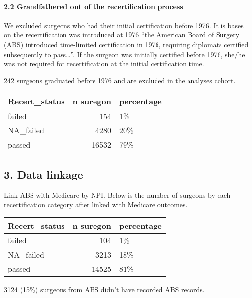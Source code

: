 \documentclass[
]{article}
\begin{document}
\hypertarget{grandfathered-out-of-the-recertification-process}{%
\paragraph{2.2 Grandfathered out of the recertification
process}\label{grandfathered-out-of-the-recertification-process}}

We excluded surgeons who had their initial certification before 1976. It
is bases on the recertification was introduced at 1976 ``the American
Board of Surgery (ABS) introduced time-limited certification in 1976,
requiring diplomats certified subsequently to pass\ldots{}''. If the
surgeon was initially certified before 1976, she/he was not required for
recertification at the initial certification time.

242 surgeons graduated before 1976 and are excluded in the analyses
cohort.

\begin{table}[H]
\centering
\begin{tabular}{l|r|l}
\hline
Recert\_status & n suregon & percentage\\
\hline
failed & 154 & 1\%\\
\hline
NA\_failed & 4280 & 20\%\\
\hline
passed & 16532 & 79\%\\
\hline
\end{tabular}
\end{table}

\hypertarget{data-linkage}{%
\subsection{3. Data linkage}\label{data-linkage}}

Link ABS with Medicare by NPI. Below is the number of surgeons by each
recertification category after linked with Medicare outcomes.

\begin{table}[H]
\centering
\begin{tabular}{l|r|l}
\hline
Recert\_status & n suregon & percentage\\
\hline
failed & 104 & 1\%\\
\hline
NA\_failed & 3213 & 18\%\\
\hline
passed & 14525 & 81\%\\
\hline
\end{tabular}
\end{table}

3124 (15\%) surgeons from ABS didn't have recorded ABS records.
\end{document}
